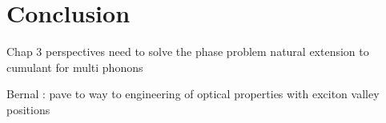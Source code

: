 \chapter*{Conclusion}


Chap 3
perspectives
need to solve the phase problem 
natural extension to cumulant for multi phonons

Bernal : pave to way to engineering of optical properties with exciton valley positions
% 
